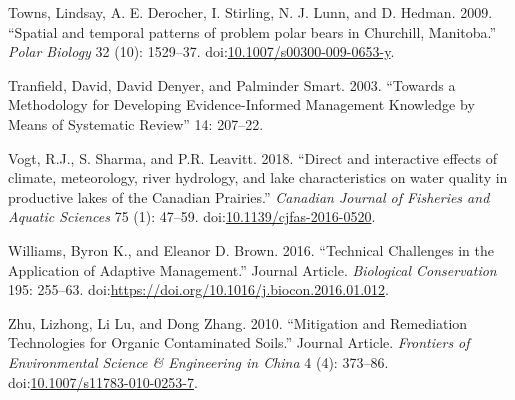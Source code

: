 \documentclass[fleqn,10pt]{wlpeerj} %
\begin{document}
\hypertarget{ref-Towns2009}{}
Towns, Lindsay, A. E. Derocher, I. Stirling, N. J. Lunn, and D. Hedman.
2009. ``Spatial and temporal patterns of problem polar bears in
Churchill, Manitoba.'' \emph{Polar Biology} 32 (10): 1529--37.
doi:\href{https://doi.org/10.1007/s00300-009-0653-y}{10.1007/s00300-009-0653-y}.

\hypertarget{ref-Tranfield2003}{}
Tranfield, David, David Denyer, and Palminder Smart. 2003. ``Towards a
Methodology for Developing Evidence-Informed Management Knowledge by
Means of Systematic Review'' 14: 207--22.

\hypertarget{ref-Vogt2018}{}
Vogt, R.J., S. Sharma, and P.R. Leavitt. 2018. ``Direct and interactive
effects of climate, meteorology, river hydrology, and lake
characteristics on water quality in productive lakes of the Canadian
Prairies.'' \emph{Canadian Journal of Fisheries and Aquatic Sciences} 75
(1): 47--59.
doi:\href{https://doi.org/10.1139/cjfas-2016-0520}{10.1139/cjfas-2016-0520}.

\hypertarget{ref-Williams2016}{}
Williams, Byron K., and Eleanor D. Brown. 2016. ``Technical Challenges
in the Application of Adaptive Management.'' Journal Article.
\emph{Biological Conservation} 195: 255--63.
doi:\href{https://doi.org/https://doi.org/10.1016/j.biocon.2016.01.012}{https://doi.org/10.1016/j.biocon.2016.01.012}.

\hypertarget{ref-Zhu2010}{}
Zhu, Lizhong, Li Lu, and Dong Zhang. 2010. ``Mitigation and Remediation
Technologies for Organic Contaminated Soils.'' Journal Article.
\emph{Frontiers of Environmental Science \& Engineering in China} 4 (4):
373--86.
doi:\href{https://doi.org/10.1007/s11783-010-0253-7}{10.1007/s11783-010-0253-7}.
\end{document}
